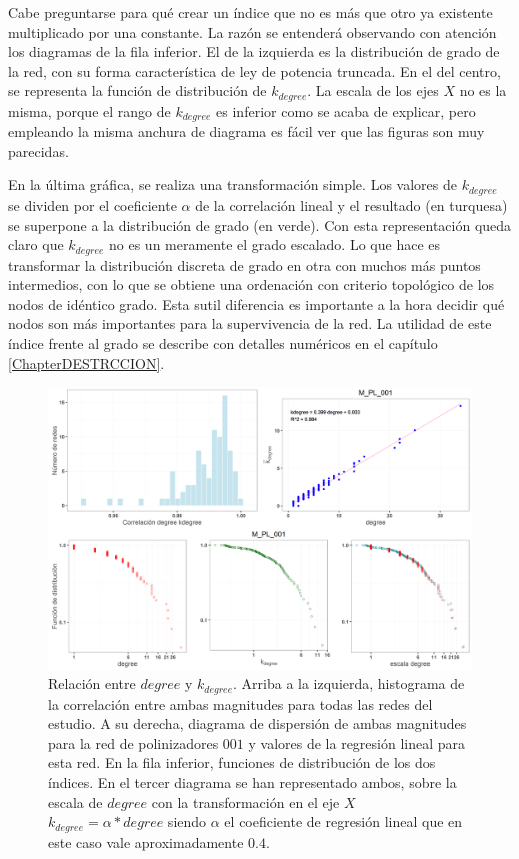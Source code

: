 Cabe preguntarse para qué crear un índice que no es más que otro ya existente multiplicado por una constante. La razón se entenderá observando con atención los diagramas de la fila inferior. El de la izquierda es la distribución de grado de la red, con su forma característica de ley de potencia truncada. En el del centro, se representa la función de distribución de $k_{degree}$. La escala de los ejes $X$ no es la misma, porque el rango de $k_{degree}$ es inferior como se acaba de explicar, pero empleando la misma anchura de diagrama es fácil ver que las figuras son muy parecidas.

En la última gráfica, se realiza una transformación simple. Los valores de $k_{degree}$ se dividen por el coeficiente $\alpha$ de la correlación lineal y el resultado (en turquesa) se superpone a la distribución de grado (en verde). Con esta representación queda claro que $k_{degree}$ no es un meramente el grado escalado. Lo que hace es transformar la distribución discreta de grado en otra con muchos más puntos intermedios, con lo que se obtiene una ordenación con criterio topológico de los nodos de idéntico grado. Esta sutil diferencia es importante a la hora decidir qué nodos son más importantes para la supervivencia de la red. La utilidad de este índice frente al grado se describe con detalles numéricos en el capítulo \ref{ChapterDESTRCCION}.

\begin{figure}[h!]
\centering
\includegraphics[scale=0.5]{Figures/ESTATICA_ALL_plots_kdegree_degree_M_PL_001_ES.png}
\caption{Relación entre $degree$ y $k_{degree}$. Arriba a la izquierda, histograma de la correlación entre ambas magnitudes para todas las redes del estudio. A su derecha, diagrama de dispersión de ambas magnitudes para la red de polinizadores $001$ y valores de la regresión lineal para esta red. En la fila inferior, funciones de distribución de los dos índices. En el tercer diagrama se han representado ambos, sobre la escala de $degree$ con la transformación en el eje $X$ $k_{degree} = \alpha * degree$ siendo $\alpha$ el coeficiente de regresión lineal que en este caso vale aproximadamente $0.4$.}
\label{fig:ESTATICA_ALL_plots_kdegree_degree_M_PL_001_ES}
\end{figure}



